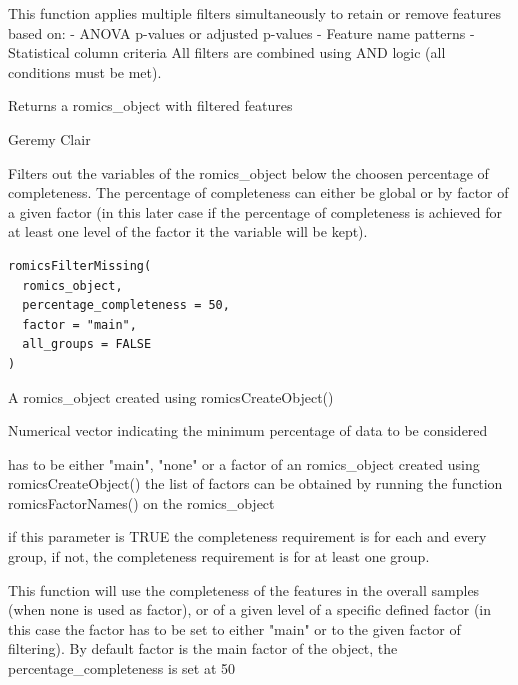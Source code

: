 \documentclass[a4paper]{book}
\begin{document}
%
\begin{Details}
This function applies multiple filters simultaneously to retain or remove features based on:
- ANOVA p-values or adjusted p-values
- Feature name patterns
- Statistical column criteria
All filters are combined using AND logic (all conditions must be met).
\end{Details}
%
\begin{Value}
Returns a romics\_object with filtered features
\end{Value}
%
\begin{Author}
Geremy Clair
\end{Author}
%
\begin{Description}
Filters out the variables of the romics\_object below the choosen percentage of completeness. The percentage of completeness can either be global or by factor of a given factor (in this later case if the percentage of completeness is achieved for at least one level of the factor it the variable will be kept).
\end{Description}
%
\begin{Usage}
\begin{verbatim}
romicsFilterMissing(
  romics_object,
  percentage_completeness = 50,
  factor = "main",
  all_groups = FALSE
)
\end{verbatim}
\end{Usage}
%
\begin{Arguments}
\begin{ldescription}
\item[\code{romics\_object}] A romics\_object created using romicsCreateObject()

\item[\code{percentage\_completeness}] Numerical vector indicating the minimum percentage of data to be considered

\item[\code{factor}] has to be either "main", "none" or a factor of an romics\_object created using romicsCreateObject() the list of factors can be obtained by running the function romicsFactorNames() on the romics\_object

\item[\code{all\_groups}] if this parameter is TRUE the completeness requirement is for each and every group, if not, the completeness requirement is for at least one group.
\end{ldescription}
\end{Arguments}
%
\begin{Details}
This function will use the completeness of the features in the overall samples (when none is used as factor), or of a given level of a specific defined factor (in this case the factor has to be set to either "main" or to the given factor of filtering). By default factor is the main factor of the object, the percentage\_completeness is set at 50
\end{Details}
\end{document}
